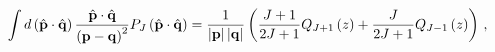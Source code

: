 \begin{equation}
\int d\left( \hat{\mathbf{p}}\cdot \hat{\mathbf{q}}\right) \frac{%
\hat{\mathbf{p}}\cdot \hat{\mathbf{q}}}{\left( \mathbf{p}-\mathbf{q}%
\right) ^{2}}P_{J}\left( \hat{\mathbf{p}}\cdot \hat{\mathbf{q}}%
\right) =\frac{1}{\left| \mathbf{p}\right| \left| \mathbf{q}\right| }\left( 
\frac{J+1}{2J+1}Q_{J+1}\left( z\right) +\frac{J}{2J+1}Q_{J-1}\left( z\right)
\right) \, ,
\end{equation}

